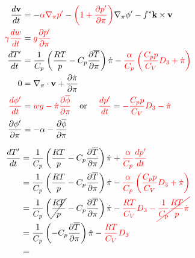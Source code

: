 \documentclass[12pt]{article}
\numberwithin{equation}{section}
\renewcommand{\d}[2]{\frac{d #1}{d #2}}
\newcommand{\dt}[1]{\d{#1}{t}}
\newcommand{\pd}[2]{\frac{\partial #1}{\partial #2}}
\newcommand{\pdz}[1]{\pd{#1}{\pi}}
\renewcommand{\vec}[1]{\mathbf{#1}}
\newcommand{\grad}[2][\pi]{\nabla_{#1} #2}
\renewcommand{\div}[2][\pi]{\nabla_{#1} \cdot #2}
\begin{document}
\begin{align*}
  \dt{\vec{v}} & = - {\color{red}\alpha \grad{p^\prime}} - {\color{red}\left(1 + \pd{p^\prime}{\pi}\right)} \grad{\phi^\prime} - f^* \vec{k} \times \vec{v} \\
  {\color{red}\gamma \dt{w}} & = {\color{red}g \pd{p^\prime}{\pi}} \\
  \dt{T^\prime} & = \frac{1}{C_p} \left(\frac{R T}{p} - C_p \pd{\overline{T}}{\pi} \right) \dot{\pi} - {\color{red}\frac{\alpha}{C_p} \left(\frac{C_p p}{C_V} D_3 + \dot{\pi}\right)} \\
  0 & = \div{\vec{v}} + \pd{\dot{\pi}}{\pi} \\
  {\color{red}\dt{\phi^\prime}} & = {\color{red}w g - \dot{\pi} \pdz{\overline{\phi}}} \text{\quad or \quad} {\color{red}\dt{p^\prime}} = {\color{red}-\frac{C_p p}{C_V} D_3 - \dot{\pi}} \\
  \pd{\phi^\prime}{\pi} & = - \alpha - \pd{\overline{\phi}}{\pi}
\end{align*}

\begin{align*}
  \dt{T^\prime} & = \frac{1}{C_p} \left(\frac{R T}{p} - C_p \pd{\overline{T}}{\pi}\right) \dot{\pi} + {\color{red}\frac{\alpha}{C_p} \dt{p^\prime}} \\
  & = \frac{1}{C_p} \left(\frac{R T}{p} - C_p \pd{\overline{T}}{\pi}\right) \dot{\pi} - {\color{red}\frac{\alpha}{C_p} \left(\frac{C_p p}{C_V} D_3 + \dot{\pi}\right)} \\
  & = \frac{1}{C_p} \left(\cancel{\frac{R T}{p}} - C_p \pd{\overline{T}}{\pi}\right) \dot{\pi} - {\color{red}\frac{R T}{C_V} D_3 - \cancel{\frac{1}{C_p} \frac{R T}{p} \dot{\pi}}} \\
  & = \frac{1}{C_p} \left(- C_p \pd{\overline{T}}{\pi}\right) \dot{\pi} - {\color{red}\frac{R T}{C_V} D_3} \\
  & = 
\end{align*}
\end{document}
